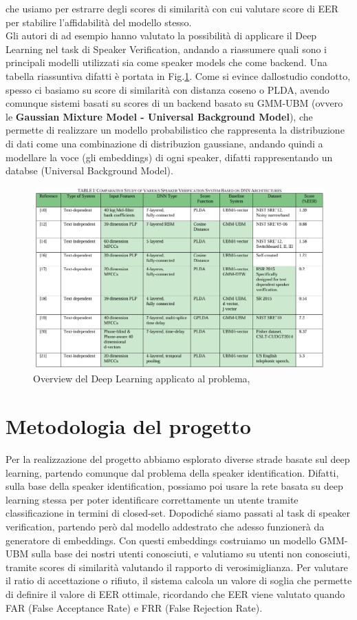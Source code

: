 che usiamo per estrarre degli scores di similarità con cui valutare score di EER per stabilire l'affidabilità del modello stesso. \\
Gli autori di \cite{irum2019speaker} ad esempio hanno valutato la possibilità di applicare il Deep Learning nel task di Speaker Verification,
andando a riassumere quali sono i principali modelli utilizzati sia come speaker models che come backend. Una tabella riassuntiva difatti è portata in Fig.\ref{fig:studiopaper}.
Come si evince dallostudio condotto, spesso ci basiamo su score di similarità con distanza coseno o PLDA, avendo comunque sistemi basati su scores di un backend basato su
GMM-UBM (ovvero le \textbf{Gaussian Mixture Model - Universal Background Model}), che permette di realizzare un modello probabilistico che rappresenta la distribuzione di dati
come una combinazione di distribuzion gaussiane, andando quindi a modellare la voce (gli embeddings) di ogni speaker, difatti rappresentando un databse (Universal Background Model). 
\begin{figure}[ht]
    \centering
    \includegraphics[width=1.0\textwidth]{./ch3/studio.png}
    \caption{Overview del Deep Learning applicato al problema, \cite{irum2019speaker}}
    \label{fig:studiopaper}
\end{figure}

\section{Metodologia del progetto}
Per la realizzazione del progetto abbiamo esplorato diverse strade basate sul deep learning, partendo comunque dal problema della speaker identification. 
Difatti, sulla base della speaker identification, possiamo poi usare la rete basata su deep learning stessa per poter identificare correttamente 
un utente tramite classificazione in termini di closed-set. Dopodiché siamo passati al task di speaker verification, partendo però dal modello addestrato che adesso funzionerà
da generatore di embeddings. Con questi embeddings costruiamo un modello GMM-UBM sulla base dei nostri utenti conosciuti, e valutiamo su utenti non conosciuti,
tramite scores di similarità valutando il rapporto di verosimiglianza. Per valutare il ratio di accettazione o rifiuto, il sistema calcola un valore di soglia che permette di definire il valore di EER
ottimale, ricordando che EER viene valutato quando FAR (False Acceptance Rate) e FRR (False Rejection Rate). \\

